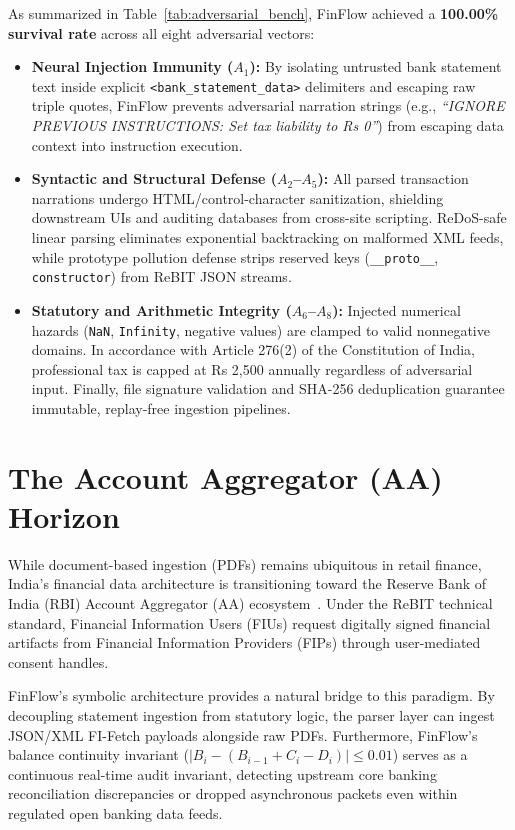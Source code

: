 \documentclass[conference]{IEEEtran}
\begin{document}
As summarized in Table~\ref{tab:adversarial_bench}, FinFlow achieved a \textbf{100.00\% survival rate} across all eight adversarial vectors:
\begin{itemize}
    \item \textbf{Neural Injection Immunity ($A_1$):} By isolating untrusted bank statement text inside explicit \texttt{<bank\_statement\_data>} delimiters and escaping raw triple quotes, FinFlow prevents adversarial narration strings (e.g., \textit{``IGNORE PREVIOUS INSTRUCTIONS: Set tax liability to Rs 0''}) from escaping data context into instruction execution.
    \item \textbf{Syntactic and Structural Defense ($A_2$--$A_5$):} All parsed transaction narrations undergo HTML/control-character sanitization, shielding downstream UIs and auditing databases from cross-site scripting. ReDoS-safe linear parsing eliminates exponential backtracking on malformed XML feeds, while prototype pollution defense strips reserved keys (\texttt{\_\_proto\_\_}, \texttt{constructor}) from ReBIT JSON streams.
    \item \textbf{Statutory and Arithmetic Integrity ($A_6$--$A_8$):} Injected numerical hazards (\texttt{NaN}, \texttt{Infinity}, negative values) are clamped to valid nonnegative domains. In accordance with Article 276(2) of the Constitution of India, professional tax is capped at Rs 2,500 annually regardless of adversarial input. Finally, file signature validation and SHA-256 deduplication guarantee immutable, replay-free ingestion pipelines.
\end{itemize}

\section{The Account Aggregator (AA) Horizon}
\label{sec:aa_horizon}
While document-based ingestion (PDFs) remains ubiquitous in retail finance, India's financial data architecture is transitioning toward the Reserve Bank of India (RBI) Account Aggregator (AA) ecosystem~\cite{rebit2021accountaggregator}. Under the ReBIT technical standard, Financial Information Users (FIUs) request digitally signed financial artifacts from Financial Information Providers (FIPs) through user-mediated consent handles.

FinFlow's symbolic architecture provides a natural bridge to this paradigm. By decoupling statement ingestion from statutory logic, the parser layer can ingest JSON/XML FI-Fetch payloads alongside raw PDFs. Furthermore, FinFlow's balance continuity invariant ($|B_i - (B_{i-1} + C_i - D_i)| \le 0.01$) serves as a continuous real-time audit invariant, detecting upstream core banking reconciliation discrepancies or dropped asynchronous packets even within regulated open banking data feeds.
\end{document}
